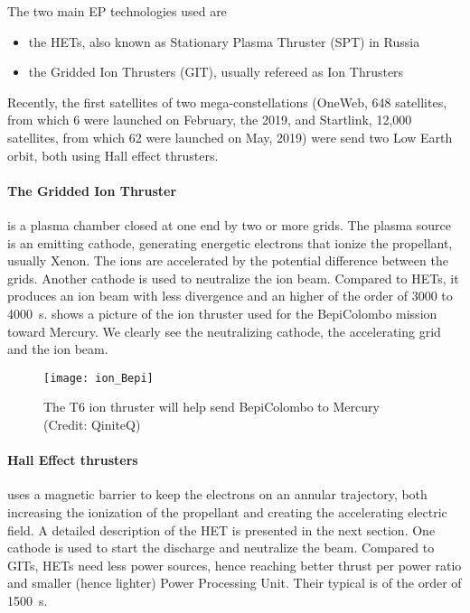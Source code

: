 The two main \ac{EP} technologies used are
\begin{itemize}
  \item the \ac{HET}s, also known as Stationary Plasma Thruster (SPT) in Russia
  \item the Gridded Ion Thrusters (GIT), usually refereed as Ion Thrusters
\end{itemize}

Recently, the first satellites of two mega-constellations (OneWeb, 648 satellites, from which 6 were launched on February, the  2019, and Startlink, 12,000 satellites, from which 62 were launched on May,  2019) were send two Low Earth orbit, both using Hall effect thrusters. 


 
 \paragraph{The Gridded Ion Thruster} is a plasma chamber closed at one end by two or more grids.
 The plasma source is an emitting cathode, generating energetic electrons that ionize the propellant, usually Xenon.
 The ions are accelerated by the potential difference between the grids.
 Another cathode is used to neutralize the ion beam.
 Compared to \ac{HET}s, it produces an ion beam with less divergence and an higher \Isp of the order of 3000 to 4000~s.
  shows a picture of the ion thruster used for the BepiColombo mission toward Mercury.
 We clearly see the neutralizing cathode, the accelerating grid and the ion beam.
 
\begin{figure}[hbtp]
  \centering
  \texttt{[image: ion\_Bepi]}
  \caption{The T6 ion thruster will help send BepiColombo to Mercury (Credit: QiniteQ)}
  \label{fig-iongridded}
\end{figure}
 
 \paragraph{Hall Effect thrusters} uses a magnetic barrier to keep the electrons on an annular trajectory, both increasing the ionization of the propellant and creating the accelerating electric field.
 A detailed description of the \ac{HET} is presented in the next section.
 One cathode is used to start the discharge and neutralize the beam.
 Compared to GITs, HETs need less power sources, hence reaching better thrust per power ratio and smaller (hence lighter) Power Processing Unit.
 Their typical \Isp is of the order of 1500~s.
 
